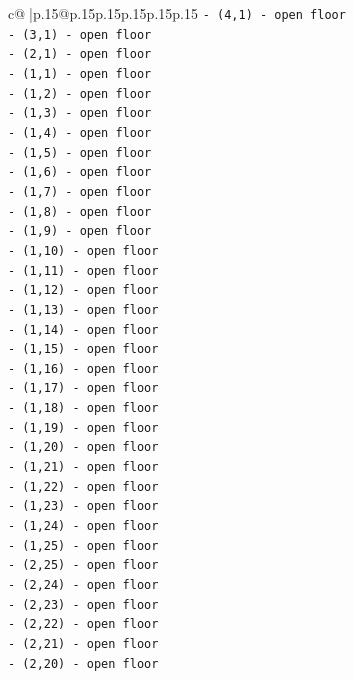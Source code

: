 \documentclass{article}
\begin{document}
{\begin{supertabular}{c@{$\;$}|p{.15\linewidth}@{}p{.15\linewidth}p{.15\linewidth}p{.15\linewidth}p{.15\linewidth}p{.15\linewidth}}
{{{\texttt{{-} (4,1) {-} open floor} \\
\texttt{{-} (3,1) {-} open floor} \\
\texttt{{-} (2,1) {-} open floor} \\
\texttt{{-} (1,1) {-} open floor} \\
\texttt{{-} (1,2) {-} open floor} \\
\texttt{{-} (1,3) {-} open floor} \\
\texttt{{-} (1,4) {-} open floor} \\
\texttt{{-} (1,5) {-} open floor} \\
\texttt{{-} (1,6) {-} open floor} \\
\texttt{{-} (1,7) {-} open floor} \\
\texttt{{-} (1,8) {-} open floor} \\
\texttt{{-} (1,9) {-} open floor} \\
\texttt{{-} (1,10) {-} open floor} \\
\texttt{{-} (1,11) {-} open floor} \\
\texttt{{-} (1,12) {-} open floor} \\
\texttt{{-} (1,13) {-} open floor} \\
\texttt{{-} (1,14) {-} open floor} \\
\texttt{{-} (1,15) {-} open floor} \\
\texttt{{-} (1,16) {-} open floor} \\
\texttt{{-} (1,17) {-} open floor} \\
\texttt{{-} (1,18) {-} open floor} \\
\texttt{{-} (1,19) {-} open floor} \\
\texttt{{-} (1,20) {-} open floor} \\
\texttt{{-} (1,21) {-} open floor} \\
\texttt{{-} (1,22) {-} open floor} \\
\texttt{{-} (1,23) {-} open floor} \\
\texttt{{-} (1,24) {-} open floor} \\
\texttt{{-} (1,25) {-} open floor} \\
\texttt{{-} (2,25) {-} open floor} \\
\texttt{{-} (2,24) {-} open floor} \\
\texttt{{-} (2,23) {-} open floor} \\
\texttt{{-} (2,22) {-} open floor} \\
\texttt{{-} (2,21) {-} open floor} \\
\texttt{{-} (2,20) {-} open floor} \\
}}}
\end{supertabular}}
\end{document}
